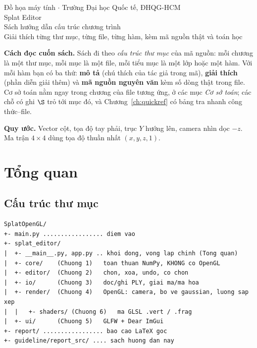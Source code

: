 \documentclass[10pt,a4paper]{extarticle}
\newcommand{\sectionname}{Chương}
\begin{document}
\begin{center}
\noindent\colorbox{bannergray}{\parbox{\dimexpr\textwidth-2\fboxsep}{\centering\vspace{6pt}
  {\small Đồ họa máy tính \;$\cdot$\; Trường Đại học Quốc tế, ĐHQG-HCM}\\[8pt]
  {\Huge Splat Editor}\\[6pt]
  {\Large Sách hướng dẫn cấu trúc chương trình}\\[4pt]
  {\small Giải thích từng thư mục, từng file, từng hàm, kèm mã nguồn thật và toán học}\vspace{6pt}}}
\end{center}
\vspace{4pt}

\noindent\textbf{Cách đọc cuốn sách.} Sách đi theo \emph{cấu trúc thư mục} của mã nguồn: mỗi chương là một thư mục, mỗi mục là một file, mỗi tiểu mục là một lớp hoặc một hàm.
Với mỗi hàm bạn có ba thứ: \textbf{mô tả} (chú thích của tác giả trong mã), \textbf{giải thích} (phần diễn giải thêm) và \textbf{mã nguồn nguyên văn} kèm số dòng thật
trong file. Cơ sở toán nằm ngay trong chương của file tương ứng, ở các mục \textit{Cơ sở toán}; các chỗ có ghi $\S$ trỏ tới mục đó, và Chương~\ref{ch:quickref} có bảng tra nhanh công thức--file.

\noindent\textbf{Quy ước.} Vector cột, tọa độ tay phải, trục $Y$ hướng lên, camera nhìn dọc $-z$. Ma trận $4\times4$ dùng tọa độ thuần nhất $(x,y,z,1)$.

\tableofcontents
\clearpage

\renewcommand{\sectionname}{Chương}
\section*{Tổng quan}
\label{ch:overview}
\subsection*{Cấu trúc thư mục}
\begin{small}
\begin{Verbatim}[fontsize=\fontsize{6.8}{7.8}\selectfont]
SplatOpenGL/
+- main.py ................. diem vao
+- splat_editor/
|  +- __main__.py, app.py .. khoi dong, vong lap chinh (Tong quan)
|  +- core/    (Chuong 1)   toan thuan NumPy, KHONG co OpenGL
|  +- editor/  (Chuong 2)   chon, xoa, undo, co chon
|  +- io/      (Chuong 3)   doc/ghi PLY, giai ma/ma hoa
|  +- render/  (Chuong 4)   OpenGL: camera, bo ve gaussian, luong sap xep
|  |   +- shaders/ (Chuong 6)   ma GLSL .vert / .frag
|  +- ui/      (Chuong 5)   GLFW + Dear ImGui
+- report/ ................. bao cao LaTeX goc
+- guideline/report_src/ .... sach huong dan nay
\end{Verbatim}
\end{small}
\end{document}
